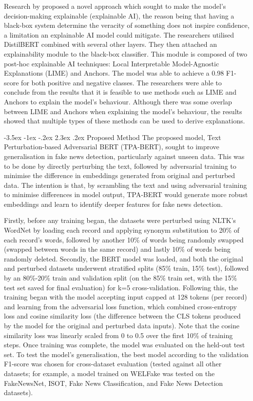\documentclass[
]{article}
\makeatletter
\renewcommand\section{\@startsection{section}{1}{\z@}%
  {-3.5ex \@plus -1ex \@minus -.2ex}%
  {2.3ex \@plus .2ex}%
  {\normalfont\fontsize{12}{14}\selectfont\bfseries}}
\makeatother
\begin{document}
Research by \textcite{xai-bert} proposed a novel approach which sought to make the model's decision-making explainable (explainable AI), the reason being that having a black-box system determine the veracity of something does not inspire confidence, a limitation an explainable AI model could mitigate. The researchers utilised DistilBERT combined with several other layers. They then attached an explainability module to the black-box classifier. This module is composed of two post-hoc explainable AI techniques: Local Interpretable Model-Agnostic Explanations (LIME) and Anchors. The model was able to achieve a 0.98 F1-score for both positive and negative classes. The researchers were able to conclude from the results that it is feasible to use methods such as LIME and Anchors to explain the model's behaviour. Although there was some overlap between LIME and Anchors when explaining the model's behaviour, the results showed that multiple types of these methods can be used to derive explanations. 

\section{Proposed Method}
The proposed model, Text Perturbation-based Adversarial BERT (TPA-BERT), sought to improve generalisation in fake news detection, particularly against unseen data. This was to be done by directly perturbing the text, followed by adversarial training to minimise the difference in embeddings generated from original and perturbed data. The intention is that, by scrambling the text and using adversarial training to minimise differences in model output, TPA-BERT would generate more robust embeddings and learn to identify deeper features for fake news detection.

Firstly, before any training began, the datasets were perturbed using NLTK's WordNet by loading each record and applying synonym substitution to 20\% of each record's words, followed by another 10\% of words being randomly swapped (swapped between words in the same record) and lastly 10\% of words being randomly deleted. Secondly, the BERT model was loaded, and both the original and perturbed datasets underwent stratified splits (85\% train, 15\% test), followed by an 80\%-20\% train and validation split (on the 85\% train set, with the 15\% test set saved for final evaluation) for k=5 cross-validation. Following this, the training began with the model accepting input capped at 128 tokens (per record) and learning from the adversarial loss function, which combined cross-entropy loss and cosine similarity loss (the difference between the CLS tokens produced by the model for the original and perturbed data inputs). Note that the cosine similarity loss was linearly scaled from 0 to 0.5 over the first 10\% of training steps. Once training was complete, the model was evaluated on the held-out test set. To test the model's generalisation, the best model according to the validation F1-score was chosen for cross-dataset evaluation (tested against all other datasets; for example, a model trained on WELFake was tested on the FakeNewsNet, ISOT, Fake News Classification, and Fake News Detection datasets). 
\end{document}
